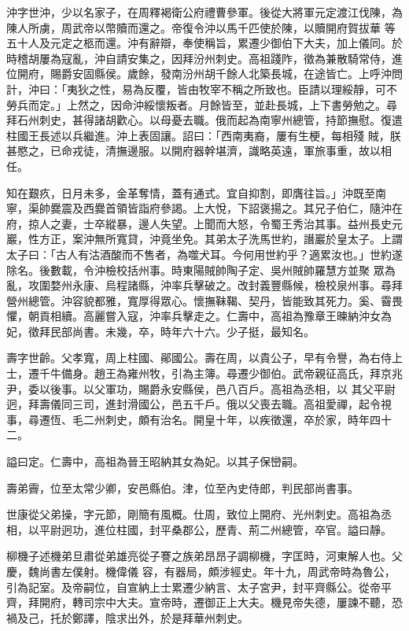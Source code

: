 \begin{pinyinscope}
 沖字世沖，少以名家子，在周釋褐衛公府禮曹參軍。後從大將軍元定渡江伐陳，為陳人所虜，周武帝以幣贖而還之。帝復令沖以馬千匹使於陳，以贖開府賀拔華
 等五十人及元定之柩而還。沖有辭辯，奉使稱旨，累遷少御伯下大夫，加上儀同。於時稽胡屢為寇亂，沖自請安集之，因拜汾州刺史。高祖踐阼，徵為兼散騎常侍，進位開府，賜爵安固縣侯。歲餘，發南汾州胡千餘人北築長城，在途皆亡。上呼沖問計，沖曰：「夷狄之性，易為反覆，皆由牧宰不稱之所致也。臣請以理綏靜，可不勞兵而定。」上然之，因命沖綏懷叛者。月餘皆至，並赴長城，上下書勞勉之。尋拜石州刺史，甚得諸胡歡心。以母憂去職。俄而起為南寧州總管，持節撫慰。復遣柱國王長述以兵繼進。沖上表固讓。詔曰：「西南夷裔，屢有生梗，每相殘
 賊，朕甚愍之，已命戎徒，清撫邊服。以開府器幹堪濟，識略英遠，軍旅事重，故以相任。



 知在艱疚，日月未多，金革奪情，蓋有通式。宜自抑割，即膺往旨。」沖既至南寧，渠帥爨震及西爨首領皆詣府參謁。上大悅，下詔褒揚之。其兄子伯仁，隨沖在府，掠人之妻，士卒縱暴，邊人失望。上聞而大怒，令蜀王秀治其事。益州長史元巖，性方正，案沖無所寬貸，沖竟坐免。其弟太子洗馬世約，譖巖於皇太子。上謂太子曰：「古人有沽酒酸而不售者，為噬犬耳。今何用世約乎？適累汝也。」世約遂除名。後數載，令沖檢校括州事。時東陽賊帥陶子定、吳州賊帥羅慧方並聚
 眾為亂，攻圍婺州永康、烏程諸縣，沖率兵擊破之。改封義豐縣候，檢校泉州事。尋拜營州總管。沖容貌都雅，寬厚得眾心。懷撫靺鞨、契丹，皆能致其死力。奚、霫畏懼，朝貢相續。高麗嘗入寇，沖率兵擊走之。仁壽中，高祖為豫章王暕納沖女為妃，徵拜民部尚書。未幾，卒，時年六十六。少子挺，最知名。



 壽字世齡。父孝寬，周上柱國、鄖國公。壽在周，以貴公子，早有令譽，為右侍上士，遷千牛備身。趙王為雍州牧，引為主簿。尋遷少御伯。武帝親征高氏，拜京兆尹，委以後事。以父軍功，賜爵永安縣侯，邑八百戶。高祖為丞相，以
 其父平尉迥，拜壽儀同三司，進封滑國公，邑五千戶。俄以父喪去職。高祖愛禪，起令視事，尋遷恆、毛二州刺史，頗有治名。開皇十年，以疾徵還，卒於家，時年四十二。



 謚曰定。仁壽中，高祖為晉王昭納其女為妃。以其子保巒嗣。



 壽弟霽，位至太常少卿，安邑縣伯。津，位至內史侍郎，判民部尚書事。



 世康從父弟操，字元節，剛簡有風概。仕周，致位上開府、光州刺史。高祖為丞相，以平尉迥功，進位柱國，封平桑郡公，歷青、荊二州總管，卒官。謚曰靜。



 柳機子述機弟旦肅從弟雄亮從子謇之族弟昂昂子調柳機，字匡時，河東解人也。父慶，魏尚書左僕射。機偉儀
 容，有器局，頗涉經史。年十九，周武帝時為魯公，引為記室。及帝嗣位，自宣納上士累遷少納言、太子宮尹，封平齊縣公。從帝平齊，拜開府，轉司宗中大夫。宣帝時，遷御正上大夫。機見帝失德，屢諫不聽，恐禍及己，托於鄭譯，陰求出外，於是拜華州刺史。




\end{pinyinscope}
